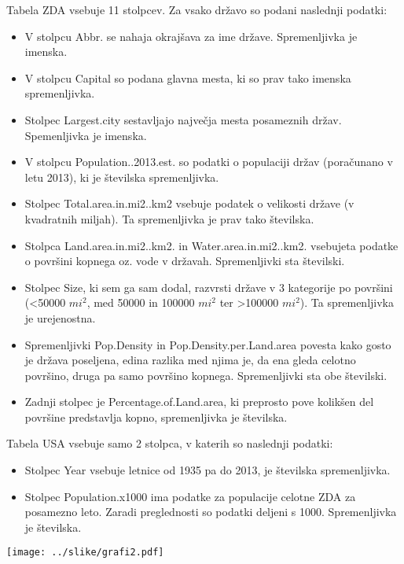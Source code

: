 \documentclass[11pt,a4paper]{article}
\begin{document}
\pagebreak 

Tabela ZDA vsebuje 11 stolpcev. Za vsako državo so podani naslednji podatki:

\begin{itemize}
  \item V stolpcu Abbr. se nahaja okrajšava za ime države. Spremenljivka je imenska.
  \item V stolpcu Capital so podana glavna mesta, ki so prav tako imenska spremenljivka.
  \item Stolpec Largest.city sestavljajo največja mesta posameznih držav. Spemenljivka je imenska.
  \item V stolpcu Population..2013.est. so podatki o populaciji držav (poračunano v letu 2013), ki je številska spremenljivka.
  \item Stolpec Total.area.in.mi2..km2 vsebuje podatek o velikosti države (v kvadratnih miljah). Ta spremenljivka je prav tako številska.
  \item Stolpca Land.area.in.mi2..km2. in Water.area.in.mi2..km2. vsebujeta podatke o površini kopnega oz. vode v državah. Spremenljivki sta številski.
  \item Stolpec Size, ki sem ga sam dodal, razvrsti države v 3 kategorije po površini (<50000 $mi^2$, med 50000 in 100000 $mi^2$ ter >100000 $mi^2$). Ta spremenljivka je urejenostna.
  \item Spremenljivki Pop.Density in Pop.Density.per.Land.area povesta kako gosto je država poseljena, edina razlika med njima je, da ena gleda celotno površino, druga pa samo površino kopnega. Spremenljivki sta obe številski.
  \item Zadnji stolpec je Percentage.of.Land.area, ki preprosto pove kolikšen del površine predstavlja kopno, spremenljivka je številska.
\end{itemize}

Tabela USA vsebuje samo 2 stolpca, v katerih so naslednji podatki:

\begin{itemize}
  \item Stolpec Year vsebuje letnice od 1935 pa do 2013, je številska spremenljivka.
  \item Stolpec Population.x1000 ima podatke za populacije celotne ZDA za posamezno leto. Zaradi preglednosti so podatki deljeni s 1000. Spremenljivka je številska.
\end{itemize}

\pagebreak

\texttt{[image: ../slike/grafi2.pdf]}
\end{document}
